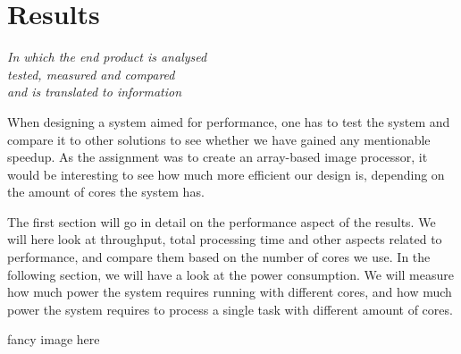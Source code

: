 \chapter{Results}\label{ch:res}

\begin{flushright}{\slshape
    In which the end product is analysed\\
    tested, measured and compared\\
    and is translated to information
}
\end{flushright}

When designing a system aimed for performance, one has to test the system and
compare it to other solutions to see whether we have gained any mentionable
speedup. As the assignment was to create an array-based image processor, it
would be interesting to see how much more efficient our design is, depending on
the amount of cores the system has.

The first section will go in detail on the performance aspect of the results. We
will here look at throughput, total processing time and other aspects related to
performance, and compare them based on the number of cores we use. In the
following section, we will have a look at the power consumption. We will measure
how much power the system requires running with different cores, and how much
power the system requires to process a single task with different amount of
cores.

{\sc fancy image here}




